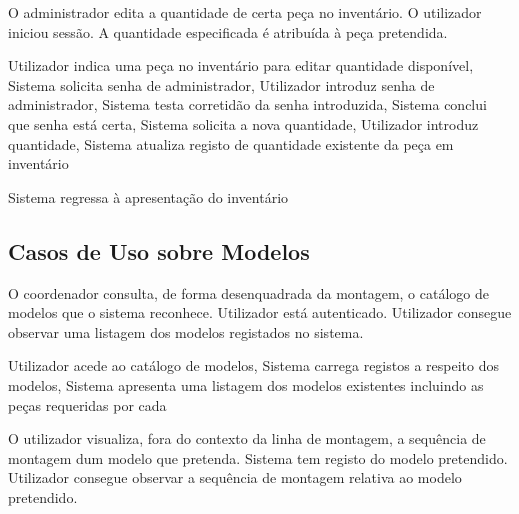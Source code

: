             \newpage
                {O administrador edita a quantidade de certa peça no inventário.}
                {O utilizador iniciou sessão.}
                {A quantidade especificada é atribuída à peça pretendida.}

            {
                Utilizador indica uma peça no inventário para editar quantidade disponível,
                Sistema solicita senha de administrador,
                Utilizador introduz senha de administrador,
                Sistema testa corretidão da senha introduzida,
                Sistema conclui que senha está certa,
                Sistema solicita a nova quantidade,
                Utilizador introduz quantidade,
                Sistema atualiza registo de quantidade existente da peça em inventário
            }

            {
                Sistema regressa à apresentação do inventário
            }
            
        \newpage        
        \subsection{Casos de Uso sobre Modelos}

                {O coordenador consulta, de forma desenquadrada da montagem, o catálogo de modelos que o sistema reconhece.}
                {Utilizador está autenticado.}
                {Utilizador consegue observar uma listagem dos modelos registados no sistema.}

            {
                Utilizador acede ao catálogo de modelos,
                Sistema carrega registos a respeito dos modelos,
                Sistema apresenta uma listagem dos modelos existentes incluindo as peças requeridas por cada
            }       
            
            \newpage
                {O utilizador visualiza, fora do contexto da linha de montagem, a sequência de montagem dum modelo que pretenda.}
                {Sistema tem registo do modelo pretendido.}
                {Utilizador consegue observar a sequência de montagem relativa ao modelo pretendido.}

